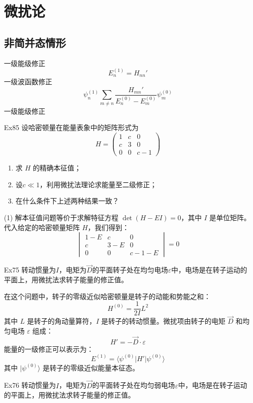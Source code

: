 \section{微扰论}

\subsection{非简并态情形}
一级能级修正
$$
    E_n^{(1)}=H_{nn}'
$$
一级波函数修正
$$
    \psi_n^{(1)}\sum_{m \neq n}\frac{H_{mn}'}{E_n^{(0)}-E_m^{(0)}}\psi_m^{(0)}
$$
一级能级修正

\begin{question}{Ex85}
    设哈密顿量在能量表象中的矩阵形式为
    $$
        H=\begin{pmatrix}
            1 & c & 0   \\
            c & 3 & 0   \\
            0 & 0 & c-1
        \end{pmatrix}
    $$
    \begin{enumerate}
        \item 求 $H$ 的精确本征值；
        \item 设$c \ll 1$，利用微扰法理论求能量至二级修正；
        \item 在什么条件下上述两种结果一致？
    \end{enumerate}
\end{question}


\begin{solution}
    (1) 解本征值问题等价于求解特征方程 $\det(H-EI)=0$，其中 $I$ 是单位矩阵。代入给定的哈密顿量矩阵 $H$，我们得到：
    $$
        \begin{vmatrix}
            1-E & c   & 0     \\
            c   & 3-E & 0     \\
            0   & 0   & c-1-E
        \end{vmatrix} = 0
    $$
\end{solution}


\begin{question}{Ex75}
    转动惯量为$I$，电矩为$\vec{D}$的平面转子处在均匀电场$\varepsilon$中，电场是在转子运动的平面上，用微扰法求转子能量的修正值。
\end{question}
\begin{solution}
    在这个问题中，转子的零级近似哈密顿量是转子的动能和势能之和：
    $$
        H^{(0)} = \frac{1}{2I}L^2
    $$
    其中 $L$ 是转子的角动量算符，$I$ 是转子的转动惯量。微扰项由转子的电矩 $\vec{D}$ 和均匀电场 $\varepsilon$ 组成：
    $$
        H' = -\vec{D} \cdot \varepsilon
    $$
    能量的一级修正可以表示为：
    $$
        E^{(1)} = \langle \psi^{(0)} | H' | \psi^{(0)} \rangle
    $$
    其中 $|\psi^{(0)}\rangle$ 是转子的零级近似能量本征态。
\end{solution}



\begin{question}{Ex76}
    转动惯量为$I$，电矩为$\vec{D}$的平面转子处在均匀弱电场$\varepsilon$中，电场是在转子运动的平面上，用微扰法求转子能量的修正值。
\end{question}
\begin{solution}
\end{solution}
